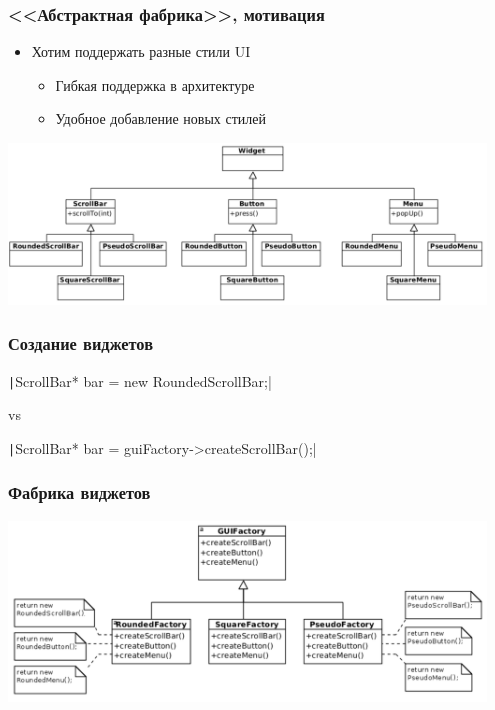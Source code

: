 \documentclass[xetex,mathserif,serif]{beamer}
\begin{document}
    \begin{frame}
        \frametitle{<<Абстрактная фабрика>>, мотивация}
        \begin{itemize}
            \item Хотим поддержать разные стили UI
            \begin{itemize}
                \item Гибкая поддержка в архитектуре
                \item Удобное добавление новых стилей
            \end{itemize}
        \end{itemize}
        \begin{center}
            \includegraphics[width=0.95\textwidth]{widgets.png}
        \end{center}
    \end{frame}

    \begin{frame}
        \frametitle{Создание виджетов}
        \texttt|ScrollBar* bar = new RoundedScrollBar;|
        
        \vspace{2mm}
        
        vs
        
        \vspace{2mm}
        
        \texttt|ScrollBar* bar = guiFactory->createScrollBar();|
    \end{frame}

    \begin{frame}
        \frametitle{Фабрика виджетов}
        \begin{center}
            \includegraphics[width=0.95\textwidth]{widgetFactory.png}
        \end{center}
    \end{frame}
\end{document}
